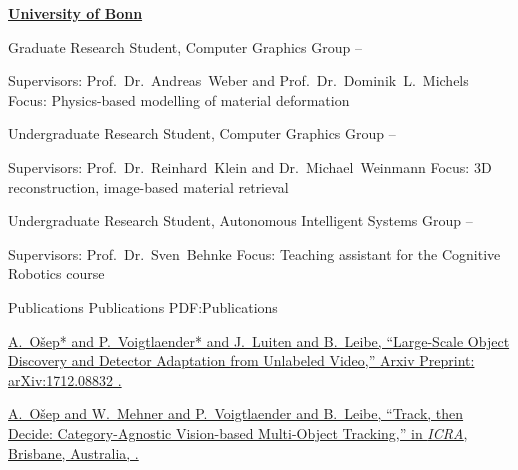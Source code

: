 \documentclass[letterpaper,MMMyyyy,nonstopmode]{simpleresumecv}
\begin{document}
\begin{Body}
\Entry
\href{https://www.uni-bonn.de/}
{\textbf{University of Bonn}}

\Gap
\BulletItem
Graduate Research Student, Computer Graphics Group
\hfill
{} --
\begin{Detail}
\SubBulletItem
Supervisors:
Prof.~Dr.~Andreas~Weber and
Prof.~Dr.~Dominik~L.~Michels
\SubBulletItem
Focus:
Physics-based modelling of material deformation
\end{Detail}

\Gap
\BulletItem
Undergraduate Research Student, Computer Graphics Group
\hfill
{} --
\begin{Detail}
\SubBulletItem
Supervisors:
Prof.~Dr.~Reinhard~Klein and
Dr.~Michael~Weinmann
\SubBulletItem
Focus:
3D reconstruction, image-based material retrieval
\end{Detail}

\Gap
\BulletItem
Undergraduate Research Student, Autonomous Intelligent Systems Group
\hfill
{} --
\begin{Detail}
\SubBulletItem
Supervisors:
Prof.~Dr.~Sven~Behnke
\SubBulletItem
Focus:
Teaching assistant for the Cognitive Robotics course 
\end{Detail}


\Section
{Publications}
{Publications}
{PDF:Publications}

%
%
%
\begingroup

\Gap
\href{https://arxiv.org/abs/1712.08832}
{\underline{A.~O\v{s}ep}* and P.~Voigtlaender* and J.~Luiten and B.~Leibe,
``Large-Scale Object Discovery and Detector Adaptation from Unlabeled Video,''
Arxiv Preprint:	arXiv:1712.08832 
.}

\Gap
\href{https://arxiv.org/pdf/1712.07920.pdf}
{\underline{A.~Ošep} and W.~Mehner and P.~Voigtlaender and B.~Leibe,
``Track, then Decide: Category-Agnostic Vision-based Multi-Object Tracking,''
in \textit{ICRA},
Brisbane, Australia,
.}


\end{Body}
\end{document}
